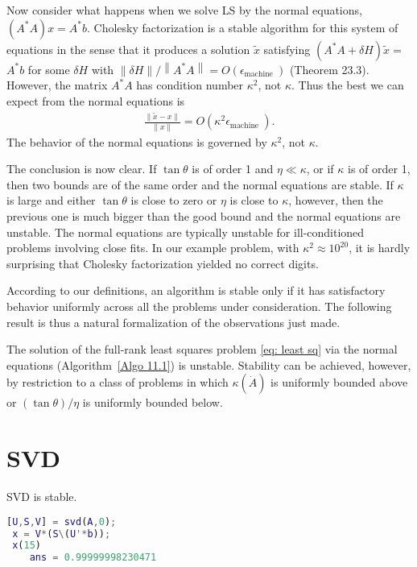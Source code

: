 Now consider what happens when we solve LS by the normal equations, $\left(A^* A\right) x=A^* b$. Cholesky factorization is a stable algorithm for this system of equations in the sense that it produces a solution $\tilde{x}$ satisfying $\left(A^* A+\delta H\right) \tilde{x}=$ $A^* b$ for some $\delta H$ with $\|\delta H\| /\left\|A^* A\right\|=O\left(\epsilon_{\text {machine }}\right)$ (Theorem 23.3). However, the matrix $A^* A$ has condition number $\kappa^2$, not $\kappa$. Thus the best we can expect from the normal equations is
\begin{align*}
\frac{\|\tilde{x}-x\|}{\|x\|}=O\left(\kappa^2 \epsilon_{\text {machine }}\right) .
\end{align*}
The behavior of the normal equations is governed by $\kappa^2$, not $\kappa$.

The conclusion is now clear. If $\tan \theta$ is of order 1 and $\eta \ll \kappa$, or if $\kappa$ is of order 1, then two bounds are of the same order and the normal equations are stable. If $\kappa$ is large and either $\tan \theta$ is close to zero or $\eta$ is close to $\kappa$, however, then the previous one is much bigger than the good bound and the normal equations are unstable. The normal equations are typically unstable for ill-conditioned problems involving close fits. In our example problem, with $\kappa^2 \approx 10^{20}$, it is hardly surprising that Cholesky factorization yielded no correct digits.

According to our definitions, an algorithm is stable only if it has satisfactory behavior uniformly across all the problems under consideration. The following result is thus a natural formalization of the observations just made.


\begin{theorem}
\label{thm: Stability of normal equations}
The solution of the full-rank least squares problem \eqref{eq: least sq} via the normal equations (Algorithm~\ref{Algo 11.1}) is unstable. Stability can be achieved, however, by restriction to a class of problems in which $\kappa(\dot{A})$ is uniformly bounded above or $(\tan \theta) / \eta$ is uniformly bounded below.
\end{theorem}

\section{SVD}
SVD is stable. 
\begin{lstlisting}[language=Matlab]
 [U,S,V] = svd(A,0); 
 x = V*(S\(U'*b));
 x(15)
    ans = 0.99999998230471
\end{lstlisting}

